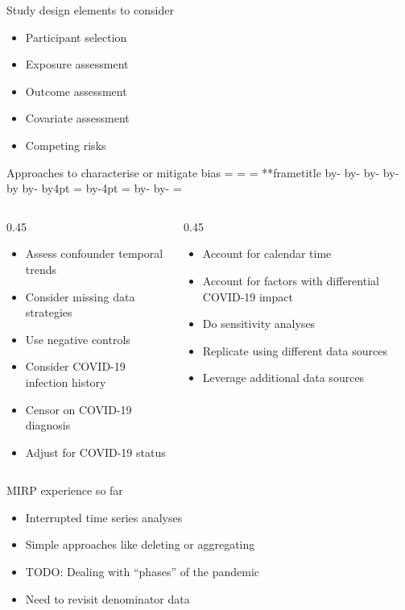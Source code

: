 \documentclass[aspectratio=169,12pt]{beamer} %
\makeatletter
\newif\ifsidebartheme
\newcommand*{\calculatespace}{%
    \contentheight=\paperheight%
    \ifx\beamer@frametitle\@empty%
        \setbox\@tempboxa=\box\voidb@x%
      \else%
        \setbox\@tempboxa=\vbox{%
          \vbox{}%
          {\parskip0pt\usebeamertemplate***{frametitle}}%
        }%
        \ifsidebartheme%
          \advance\contentheight by-1em%
        \fi%
      \fi%
    \advance\contentheight by-\ht\@tempboxa%
    \advance\contentheight by-\dp\@tempboxa%
    \advance\contentheight by-\beamer@frametopskip%
    \ifbeamer@plainframe%
    \contentbottom=0pt%
    \else%
    \advance\contentheight by-\headheight%
    \advance\contentheight by\headdp%
    \advance\contentheight by-\footheight%
    \advance\contentheight by4pt%
    \contentbottom=\footheight%
    \advance\contentbottom by-4pt%
    \fi%
    \contentwidth=\paperwidth%
    \ifbeamer@plainframe%
    \contentleft=0pt%
    \else%
    \advance\contentwidth by-\beamer@rightsidebar%
    \advance\contentwidth by-\beamer@leftsidebar\relax%
    \contentleft=\beamer@leftsidebar%
    \fi%
}
\makeatother
\begin{document}
\begin{frame}{Study design elements to consider}
	\begin{itemize}
		\item Participant selection
		\item Exposure assessment
		\item Outcome assessment
		\item Covariate assessment
		\item Competing risks
	\end{itemize}
\end{frame}

\begin{frame}{Approaches to characterise or mitigate bias}
\calculatespace%
\begin{columns}
\begin{column}{0.45\contentwidth}
	\begin{itemize}
		\item Assess confounder temporal trends
		\item Consider missing data strategies
		\item Use negative controls
		\item Consider COVID-19 infection history
		\item Censor on COVID-19 diagnosis
		\item Adjust for COVID-19 status
	\end{itemize}
\end{column}
\begin{column}{0.45\contentwidth}
	\begin{itemize}
		\item Account for calendar time
		\item Account for factors with differential COVID-19 impact
		\item Do sensitivity analyses
		\item Replicate using different data sources
		\item Leverage additional data sources
	\end{itemize}
\end{column}
\end{columns}
\end{frame}

\begin{frame}{MIRP experience so far}
	\begin{itemize}
		\item Interrupted time series analyses
		\item Simple approaches like deleting or aggregating
		\item TODO: Dealing with ``phases'' of the pandemic
		\item Need to revisit denominator data
	\end{itemize}
\end{frame}
\end{document}
